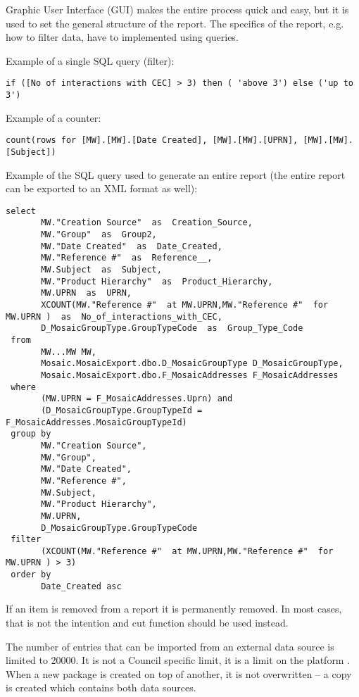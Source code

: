 Graphic User Interface (GUI) makes the entire process quick and easy, but it is used to set the general structure of the report. The specifics of the report, e.g. how to filter data, have to implemented using queries.

Example of a single SQL query (filter):
\begin{lstlisting}
if ([No of interactions with CEC] > 3) then ( 'above 3') else ('up to 3')
\end{lstlisting}
Example of a counter:
\begin{lstlisting}
count(rows for [MW].[MW].[Date Created], [MW].[MW].[UPRN], [MW].[MW].[Subject])
\end{lstlisting}
Example of the SQL query used to generate an entire report (the entire report can be exported to an XML format as well):
\begin{lstlisting}
select 
       MW."Creation Source"  as  Creation_Source,
       MW."Group"  as  Group2,
       MW."Date Created"  as  Date_Created,
       MW."Reference #"  as  Reference__,
       MW.Subject  as  Subject,
       MW."Product Hierarchy"  as  Product_Hierarchy,
       MW.UPRN  as  UPRN,
       XCOUNT(MW."Reference #"  at MW.UPRN,MW."Reference #"  for MW.UPRN )  as  No_of_interactions_with_CEC,
       D_MosaicGroupType.GroupTypeCode  as  Group_Type_Code
 from 
       MW...MW MW,
       Mosaic.MosaicExport.dbo.D_MosaicGroupType D_MosaicGroupType,
       Mosaic.MosaicExport.dbo.F_MosaicAddresses F_MosaicAddresses
 where 
       (MW.UPRN = F_MosaicAddresses.Uprn) and 
       (D_MosaicGroupType.GroupTypeId = F_MosaicAddresses.MosaicGroupTypeId)
 group by 
       MW."Creation Source",
       MW."Group",
       MW."Date Created",
       MW."Reference #",
       MW.Subject,
       MW."Product Hierarchy",
       MW.UPRN,
       D_MosaicGroupType.GroupTypeCode
 filter 
       (XCOUNT(MW."Reference #"  at MW.UPRN,MW."Reference #"  for MW.UPRN ) > 3)
 order by 
       Date_Created asc
\end{lstlisting}

If an item is removed from a report it is permanently removed. In most cases, that is not the intention and cut function should be used instead.

The number of entries that can be imported from an external data source is limited to 20000. It is not a Council specific limit, it is a limit on the platform \citep{IBM2015d}. When a new package is created on top of another, it is not overwritten – a copy is created which contains both data sources.

